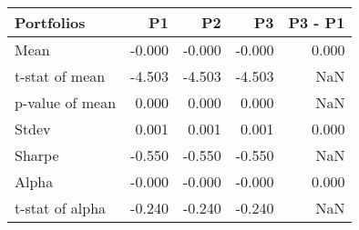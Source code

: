 \begin{tabular}{lrrrr}
\toprule
Portfolios & P1 & P2 & P3 & P3 - P1 \\
\midrule
Mean & -0.000 & -0.000 & -0.000 & 0.000 \\
t-stat of mean & -4.503 & -4.503 & -4.503 & NaN \\
p-value of mean & 0.000 & 0.000 & 0.000 & NaN \\
Stdev & 0.001 & 0.001 & 0.001 & 0.000 \\
Sharpe & -0.550 & -0.550 & -0.550 & NaN \\
Alpha & -0.000 & -0.000 & -0.000 & 0.000 \\
t-stat of alpha & -0.240 & -0.240 & -0.240 & NaN \\
\bottomrule
\end{tabular}
